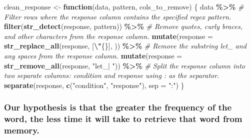 \documentclass[
]{article}
\newenvironment{Shaded}{\begin{snugshade}}{\end{snugshade}}
\newcommand{\AttributeTok}[1]{\textcolor[rgb]{0.13,0.29,0.53}{#1}}
\newcommand{\CommentTok}[1]{\textcolor[rgb]{0.56,0.35,0.01}{\textit{#1}}}
\newcommand{\ControlFlowTok}[1]{\textcolor[rgb]{0.13,0.29,0.53}{\textbf{#1}}}
\newcommand{\FunctionTok}[1]{\textcolor[rgb]{0.13,0.29,0.53}{\textbf{#1}}}
\newcommand{\NormalTok}[1]{#1}
\newcommand{\OtherTok}[1]{\textcolor[rgb]{0.56,0.35,0.01}{#1}}
\newcommand{\SpecialCharTok}[1]{\textcolor[rgb]{0.81,0.36,0.00}{\textbf{#1}}}
\newcommand{\StringTok}[1]{\textcolor[rgb]{0.31,0.60,0.02}{#1}}
\begin{document}
\begin{Shaded}
\begin{Highlighting}[]
\NormalTok{clean\_response }\OtherTok{\textless{}{-}} \ControlFlowTok{function}\NormalTok{(data, pattern, cols\_to\_remove) \{}
\NormalTok{  data }\SpecialCharTok{\%\textgreater{}\%} 
    \CommentTok{\# Filter rows where the \textquotesingle{}response\textquotesingle{} column contains the specified regex pattern.}
    \FunctionTok{filter}\NormalTok{(}\FunctionTok{str\_detect}\NormalTok{(response, pattern)) }\SpecialCharTok{\%\textgreater{}\%}
    \CommentTok{\# Remove quotes, curly braces, and other characters from the \textquotesingle{}response\textquotesingle{} column.}
    \FunctionTok{mutate}\NormalTok{(}\AttributeTok{response =} \FunctionTok{str\_replace\_all}\NormalTok{(response, }\StringTok{\textquotesingle{}[}\SpecialCharTok{\textbackslash{}"}\StringTok{\{\}]\textquotesingle{}}\NormalTok{, }\StringTok{\textquotesingle{}\textquotesingle{}}\NormalTok{)) }\SpecialCharTok{\%\textgreater{}\%}
    \CommentTok{\# Remove the substring \textquotesingle{}let\_\textquotesingle{} and any spaces from the \textquotesingle{}response\textquotesingle{} column.}
    \FunctionTok{mutate}\NormalTok{(}\AttributeTok{response =} \FunctionTok{str\_remove\_all}\NormalTok{(response, }\StringTok{"let\_| "}\NormalTok{)) }\SpecialCharTok{\%\textgreater{}\%}
    \CommentTok{\# Split the \textquotesingle{}response\textquotesingle{} column into two separate columns: \textquotesingle{}condition\textquotesingle{} and \textquotesingle{}response\textquotesingle{} using \textquotesingle{}:\textquotesingle{} as the separator.}
    \FunctionTok{separate}\NormalTok{(response, }\FunctionTok{c}\NormalTok{(}\StringTok{"condition"}\NormalTok{, }\StringTok{"response"}\NormalTok{), }\AttributeTok{sep =} \StringTok{":"}\NormalTok{)}
\NormalTok{\}}
\end{Highlighting}
\end{Shaded}

\hypertarget{our-hypothesis-is-that-the-greater-the-frequency-of-the-word-the-less-time-it-will-take-to-retrieve-that-word-from-memory.}{%
\subsubsection{Our hypothesis is that the greater the frequency of the
word, the less time it will take to retrieve that word from
memory.}\label{our-hypothesis-is-that-the-greater-the-frequency-of-the-word-the-less-time-it-will-take-to-retrieve-that-word-from-memory.}}
\end{document}
